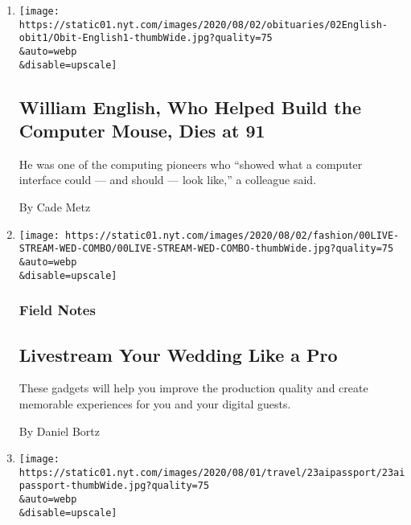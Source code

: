\begin{enumerate}
\def\labelenumi{\arabic{enumi}.}
\item
  \href{/2020/07/31/technology/william-english-who-helped-build-the-computer-mouse-dies-at-91.html}{}

  \texttt{[image: https://static01.nyt.com/images/2020/08/02/obituaries/02English-obit1/Obit-English1-thumbWide.jpg?quality=75\\\&auto=webp\\\&disable=upscale]}

  \hypertarget{william-english-who-helped-build-the-computer-mouse-dies-at-91}{%
  \subsection{William English, Who Helped Build the Computer Mouse, Dies
  at
  91}\label{william-english-who-helped-build-the-computer-mouse-dies-at-91}}

  He was one of the computing pioneers who ``showed what a computer
  interface could --- and should --- look like,'' a colleague said.

  By Cade Metz
\item
  \href{/2020/07/28/fashion/weddings/livestream-your-wedding-like-a-pro.html}{}

  \texttt{[image: https://static01.nyt.com/images/2020/08/02/fashion/00LIVE-STREAM-WED-COMBO/00LIVE-STREAM-WED-COMBO-thumbWide.jpg?quality=75\\\&auto=webp\\\&disable=upscale]}

  \hypertarget{field-notes}{%
  \subsubsection{Field Notes}\label{field-notes}}

  \hypertarget{livestream-your-wedding-like-a-pro}{%
  \subsection{Livestream Your Wedding Like a
  Pro}\label{livestream-your-wedding-like-a-pro}}

  These gadgets will help you improve the production quality and create
  memorable experiences for you and your digital guests.

  By Daniel Bortz
\item
  \href{/2020/07/23/travel/artificial-intelligence-coronavirus-passport.html}{}

  \texttt{[image: https://static01.nyt.com/images/2020/08/01/travel/23aipassport/23aipassport-thumbWide.jpg?quality=75\\\&auto=webp\\\&disable=upscale]}


\end{enumerate}
